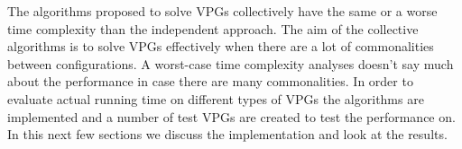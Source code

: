 The algorithms proposed to solve VPGs collectively have the same or a worse time complexity than the independent approach. The aim of the collective algorithms is to solve VPGs effectively when there are a lot of commonalities between configurations. A worst-case time complexity analyses doesn't say much about the performance in case there are many commonalities. In order to evaluate actual running time on different types of VPGs the algorithms are implemented and a number of test VPGs are created to test the performance on. In this next few sections we discuss the implementation and look at the results.